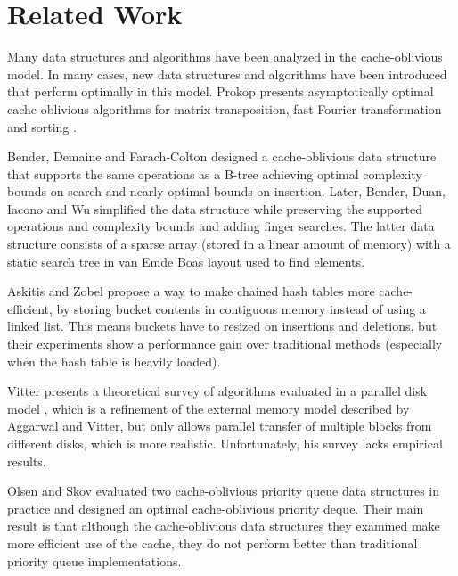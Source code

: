 \documentclass{acm_proc_article-sp}
\begin{document}
\section{Related Work}
Many data structures and algorithms have been analyzed in the cache-oblivious model. In many cases, new data structures and algorithms have been introduced that perform optimally in this model. Prokop presents asymptotically optimal cache-oblivious algorithms for matrix transposition, fast Fourier transformation and sorting \cite{prokop1999coa}.

Bender, Demaine and Farach-Colton designed a cache-oblivious data structure that supports the same operations as a B-tree \cite{bender2005cob} achieving optimal complexity bounds on search and nearly-optimal bounds on insertion. Later, Bender, Duan, Iacono and Wu simplified the data structure \cite{bender2004lpc} while preserving the supported operations and complexity bounds and adding finger searches. The latter data structure consists of a sparse array (stored in a linear amount of memory) with a static search tree in van Emde Boas layout used to find elements.

Askitis and Zobel \cite{askitis2005ccc} propose a way to make chained hash tables more cache-efficient, by storing bucket contents in contiguous memory instead of using a linked list. This means buckets have to resized on insertions and deletions, but their experiments show a performance gain over traditional methods (especially when the hash table is heavily loaded).

Vitter presents a theoretical survey of algorithms evaluated in a parallel disk model \cite{vitter2001ema}, which is a refinement of the external memory model described by Aggarwal and Vitter, but only allows parallel transfer of multiple blocks from different disks, which is more realistic. Unfortunately, his survey lacks empirical results.

Olsen and Skov evaluated two cache-oblivious priority queue data structures in practice \cite{olsen2002coa} and designed an optimal cache-oblivious priority deque. Their main result is that although the cache-oblivious data structures they examined make more efficient use of the cache, they do not perform better than traditional priority queue implementations.
\end{document}
